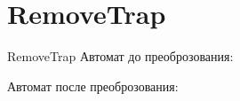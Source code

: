 \section{RemoveTrap}
\begin{frame}{RemoveTrap}
	Автомат до преоброзования:


	Автомат после преоброзования:

\end{frame}
